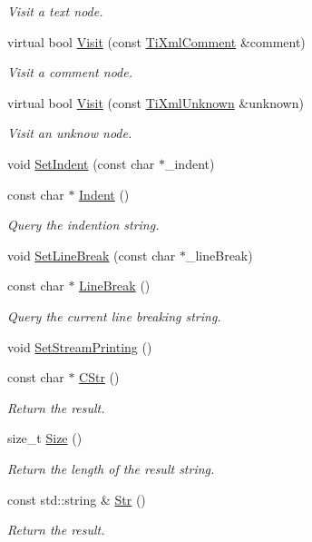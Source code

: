 \begin{DoxyCompactItemize}
\begin{DoxyCompactList}\small\item\em Visit a text node. \end{DoxyCompactList}\item 
virtual bool \hyperlink{class_ti_xml_printer_a9870423f5603630e6142f6bdb66dfb57}{Visit} (const \hyperlink{class_ti_xml_comment}{Ti\+Xml\+Comment} \&comment)
\begin{DoxyCompactList}\small\item\em Visit a comment node. \end{DoxyCompactList}\item 
virtual bool \hyperlink{class_ti_xml_printer_a08591a15c9a07afa83c24e08b03d6358}{Visit} (const \hyperlink{class_ti_xml_unknown}{Ti\+Xml\+Unknown} \&unknown)
\begin{DoxyCompactList}\small\item\em Visit an unknow node. \end{DoxyCompactList}\item 
void \hyperlink{class_ti_xml_printer_a213377a4070c7e625bae59716b089e5e}{Set\+Indent} (const char $\ast$\+\_\+indent)
\item 
const char $\ast$ \hyperlink{class_ti_xml_printer_abb33ec7d4bad6aaeb57f4304394b133d}{Indent} ()
\begin{DoxyCompactList}\small\item\em Query the indention string. \end{DoxyCompactList}\item 
void \hyperlink{class_ti_xml_printer_a4be1e37e69e3858c59635aa947174fe6}{Set\+Line\+Break} (const char $\ast$\+\_\+line\+Break)
\item 
const char $\ast$ \hyperlink{class_ti_xml_printer_a11f1b4804a460b175ec244eb5724d96d}{Line\+Break} ()
\begin{DoxyCompactList}\small\item\em Query the current line breaking string. \end{DoxyCompactList}\item 
void \hyperlink{class_ti_xml_printer_ab23a90629e374cb1cadca090468bbd19}{Set\+Stream\+Printing} ()
\item 
const char $\ast$ \hyperlink{class_ti_xml_printer_a859eede9597d3e0355b77757be48735e}{C\+Str} ()
\begin{DoxyCompactList}\small\item\em Return the result. \end{DoxyCompactList}\item 
size\+\_\+t \hyperlink{class_ti_xml_printer_ad01375ae9199bd2f48252eaddce3039d}{Size} ()
\begin{DoxyCompactList}\small\item\em Return the length of the result string. \end{DoxyCompactList}\item 
const std\+::string \& \hyperlink{class_ti_xml_printer_a3bd4daf44309b41f5813a833caa0d1c9}{Str} ()
\begin{DoxyCompactList}\small\item\em Return the result. \end{DoxyCompactList}\end{DoxyCompactItemize}
